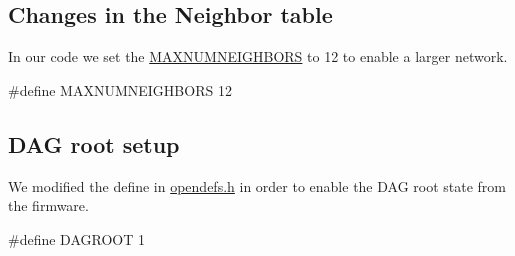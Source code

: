  \hypertarget{_l_k_n_contribution_Neighbor_edits}{}\subsection{Changes in the Neighbor table}\label{_l_k_n_contribution_Neighbor_edits}
In our code we set the \hyperlink{group___neighbors_gaf83606573bb704d34705b540c226a0d9}{M\+A\+X\+N\+U\+M\+N\+E\+I\+G\+H\+B\+O\+RS} to 12 to enable a larger network. 
\begin{DoxyCodeInclude}
\textcolor{preprocessor}{#define MAXNUMNEIGHBORS           12}
\end{DoxyCodeInclude}
 \hypertarget{_l_k_n_contribution_DAG_root}{}\subsection{D\+A\+G root setup}\label{_l_k_n_contribution_DAG_root}
We modified the define in \hyperlink{opendefs_8h}{opendefs.\+h} in order to enable the D\+AG root state from the firmware. 
\begin{DoxyCodeInclude}
\textcolor{preprocessor}{#define DAGROOT 1}
\end{DoxyCodeInclude}
